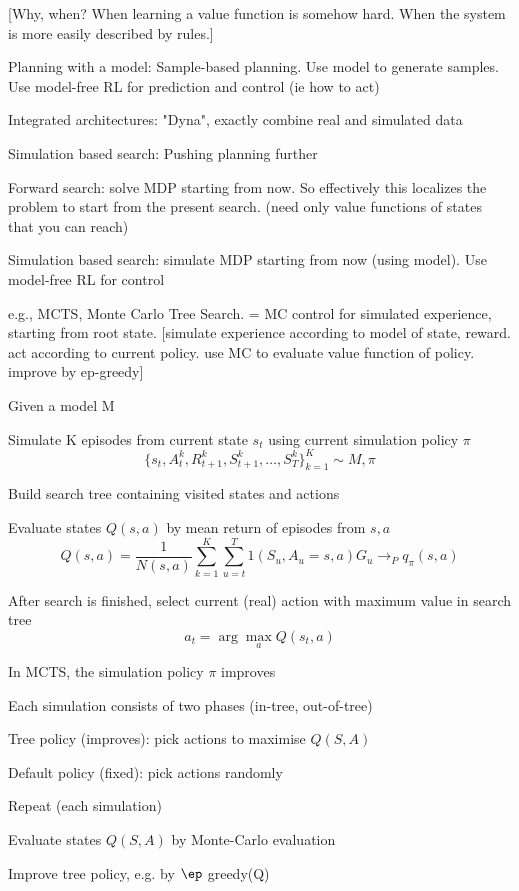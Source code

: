 \documentclass[english]{article}
\begin{document}
[Why, when? When learning a value function is somehow hard. When the system is more easily described by rules.]


\item Planning with a model: Sample-based planning. Use model to generate samples. Use model-free RL for prediction and control (ie how to act)

\item Integrated architectures: "Dyna", exactly combine real and simulated data

\item Simulation based search: Pushing planning further

Forward search: solve MDP starting from now. So effectively this localizes the problem to start from the present search. (need only value functions of states that you can reach)

Simulation based search: simulate MDP starting from now (using model). Use model-free RL for control

e.g., MCTS, Monte Carlo Tree Search. = MC control for simulated experience, starting from root state. [simulate experience according to model of state, reward. act according to current policy. use MC to evaluate value function of policy. improve by ep-greedy]

\benum
\item Given a model M
\item  Simulate K episodes from current state $s_t$ using current
simulation policy $\pi$
$$\{s_t ,A^k_t ,R^k_{t+1},S^k_{t+1},\ldots,S^k_{T}\}^K_{k=1}
\sim M,\pi$$
\item Build  search tree containing visited states and actions
\item Evaluate states $Q(s,a)$ by mean return of episodes from $s,a$
$$Q(s,a) =
\frac{1}
{N(s,a)}
\sum^K_{k=1}
\sum_{u=t}^T
1(S_u ,A_u = s,a)G_u
\to_P q_{\pi}(s,a)
$$

\item After search is finished, select current (real) action with
maximum value in search tree
$$a_t = \arg\max_a
Q(s_t ,a)$$
\eenum

In MCTS, the simulation policy $\pi$ improves

Each simulation consists of two phases (in-tree, out-of-tree)
\benum 
\item 
Tree policy (improves): pick actions to maximise $Q(S,A)$
\item 
Default policy (fixed): pick actions randomly
\eenum 
\item 
Repeat (each simulation)
\benum 
\item 
Evaluate states $Q(S,A)$ by Monte-Carlo evaluation
\item 
Improve tree policy, e.g. by $\ep$ greedy(Q)
\eenum 
\item 
\end{document}
